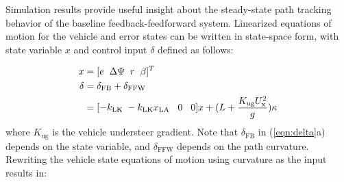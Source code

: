 \documentclass{nVSD2e}
\theoremstyle{plain}
\theoremstyle{definition}
\theoremstyle{remark}
\begin{document}
Simulation results provide useful insight about the steady-state path tracking behavior of the baseline feedback-feedforward system. 
Linearized equations of motion for the vehicle and error states can be written in state-space form, with state variable $x$ and control input $\delta$ defined as follows:

\begin{subequations}
\label{eqn:delta}
\begin{align}
		     x &= [e \hspace{2 mm} \Delta\Psi \hspace{2 mm} r \hspace{2 mm} \beta]^T \\
        \delta &=\delta_\mathrm{FB}+\delta_\mathrm{FFW} \\
               &=[-k_\mathrm{LK} \hspace{1 mm} -k_\mathrm{LK} x_\mathrm{LA} \hspace{3 mm} 0 \hspace{3 mm} 0] x+(L+\frac{K_\mathrm{ug} U_\mathrm{x}^2}{g}) \kappa
\end{align}
\end{subequations}
 where $K_\mathrm{ug}$ is the vehicle understeer gradient.
Note that $\delta_\mathrm{FB}$ in (\ref{eqn:delta}a) depends on the state variable, and $\delta_\mathrm{FFW}$ depends on the path curvature. Rewriting  
the vehicle state equations of motion using curvature as the input results in:
\end{document}
